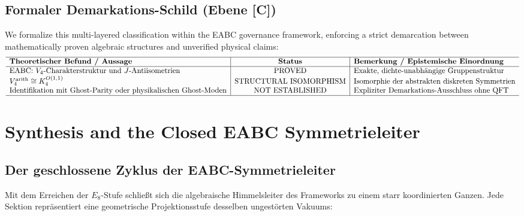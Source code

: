 \documentclass[11pt,a4paper]{article}
\theoremstyle{definition}
\begin{document}
	\subsection{Formaler Demarkations-Schild (Ebene [C])}
	We formalize this multi-layered classification within the EABC governance framework, enforcing a strict demarcation between mathematically proven algebraic structures and unverified physical claims:
	\begin{equation}
		\begin{array}{l|c|l}
			\hline
			\textbf{Theoretischer Befund / Aussage} & \textbf{Status} & \textbf{Bemerkung / Epistemische Einordnung} \\
			\hline
			\text{EABC: } V_4\text{-Charakterstruktur und } J\text{-Antiisometrien} & \mathrm{PROVED} & \text{Exakte, dichte-unabhängige Gruppenstruktur} \\
			V_4^{\mathrm{arith}} \cong K_4^{O(1,1)} & \mathrm{STRUCTURAL\ ISOMORPHISM} & \text{Isomorphie der abstrakten diskreten Symmetrien} \\
			\text{Identifikation mit Ghost-Parity oder physikalischen Ghost-Moden} & \mathrm{NOT\ ESTABLISHED} & \text{Expliziter Demarkations-Ausschluss ohne QFT} \\
			\hline
		\end{array}
	\end{equation}
	
	\section{Synthesis and the Closed EABC Symmetrieleiter}
	\label{sec:synthesis_closed_cycle}
	
	\subsection{Der geschlossene Zyklus der EABC-Symmetrieleiter}
	Mit dem Erreichen der $E_8$-Stufe schließt sich die algebraische Himmelsleiter des Frameworks zu einem starr koordinierten Ganzen. Jede Sektion repräsentiert eine geometrische Projektionsstufe desselben ungestörten Vakuums:
	
\end{document}
